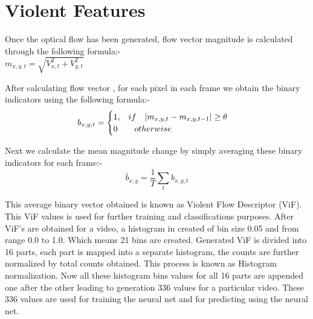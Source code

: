 \section{Violent Features}
Once the optical flow has been generated, flow vector magnitude is calculated through the following formula:- \\
$ m_{x,y,t} = \sqrt{V_{x,t}^2 + V_{y,t}^2} $ \\
\par
After calculating flow vector , for each pixel in each frame we obtain the binary indicators using the following formula:- \\
\begin{equation}
b_{x,y,t} = \begin{cases}
\text {1,\quad}if\quad |m_{x,y,t} - m_{x,y,t-1}| \geq \theta\\
\text {0\quad}   \quad otherwise
\end{cases}
\end{equation}
\par
Next we calculate the mean magnitude change by simply averaging these binary indicators for each frame:- 
\begin{equation}
\overline b_{x,y} = \frac{1}{T}\sum_{t}b_{x,y,t}
\end{equation}
\par
This average binary vector obtained is known as Violent Flow Descriptor (ViF). This ViF values is used for further training and classifications purposes.
	After ViF’s are obtained for a video, a histogram in created of bin size 0.05 and from range 0.0 to 1.0. Which means 21 bins are created. Generated ViF is divided into 16 parts, each part is mapped into a separate histogram, the counts are further normalized by total counts obtained. This process is known as Histogram normalization. Now all these histogram bins values for all 16 parts are appended one after the other leading to generation 336 values for a particular video. 
These 336 values are used for training the neural net and for predicting using the neural net.

